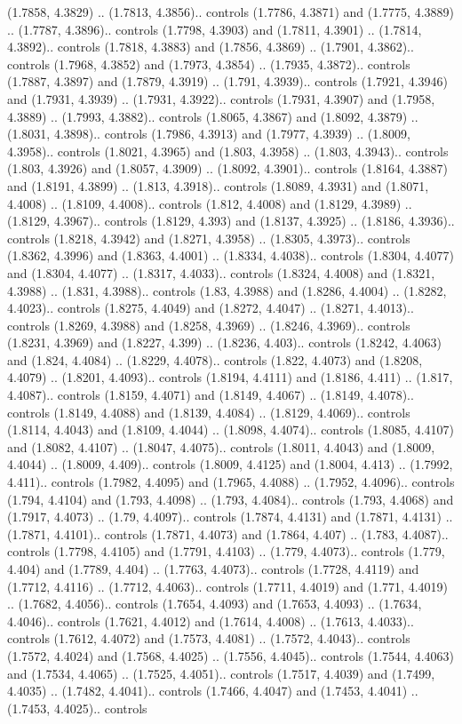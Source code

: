 (1.7858, 4.3829) .. (1.7813, 4.3856).. controls (1.7786, 4.3871) and (1.7775, 4.3889) .. (1.7787, 4.3896).. controls (1.7798, 4.3903) and (1.7811, 4.3901) .. (1.7814, 4.3892).. controls (1.7818, 4.3883) and (1.7856, 4.3869) .. (1.7901, 4.3862).. controls (1.7968, 4.3852) and (1.7973, 4.3854) .. (1.7935, 4.3872).. controls (1.7887, 4.3897) and (1.7879, 4.3919) .. (1.791, 4.3939).. controls (1.7921, 4.3946) and (1.7931, 4.3939) .. (1.7931, 4.3922).. controls (1.7931, 4.3907) and (1.7958, 4.3889) .. (1.7993, 4.3882).. controls (1.8065, 4.3867) and (1.8092, 4.3879) .. (1.8031, 4.3898).. controls (1.7986, 4.3913) and (1.7977, 4.3939) .. (1.8009, 4.3958).. controls (1.8021, 4.3965) and (1.803, 4.3958) .. (1.803, 4.3943).. controls (1.803, 4.3926) and (1.8057, 4.3909) .. (1.8092, 4.3901).. controls (1.8164, 4.3887) and (1.8191, 4.3899) .. (1.813, 4.3918).. controls (1.8089, 4.3931) and (1.8071, 4.4008) .. (1.8109, 4.4008).. controls (1.812, 4.4008) and (1.8129, 4.3989) .. (1.8129, 4.3967).. controls (1.8129, 4.393) and (1.8137, 4.3925) .. (1.8186, 4.3936).. controls (1.8218, 4.3942) and (1.8271, 4.3958) .. (1.8305, 4.3973).. controls (1.8362, 4.3996) and (1.8363, 4.4001) .. (1.8334, 4.4038).. controls (1.8304, 4.4077) and (1.8304, 4.4077) .. (1.8317, 4.4033).. controls (1.8324, 4.4008) and (1.8321, 4.3988) .. (1.831, 4.3988).. controls (1.83, 4.3988) and (1.8286, 4.4004) .. (1.8282, 4.4023).. controls (1.8275, 4.4049) and (1.8272, 4.4047) .. (1.8271, 4.4013).. controls (1.8269, 4.3988) and (1.8258, 4.3969) .. (1.8246, 4.3969).. controls (1.8231, 4.3969) and (1.8227, 4.399) .. (1.8236, 4.403).. controls (1.8242, 4.4063) and (1.824, 4.4084) .. (1.8229, 4.4078).. controls (1.822, 4.4073) and (1.8208, 4.4079) .. (1.8201, 4.4093).. controls (1.8194, 4.4111) and (1.8186, 4.411) .. (1.817, 4.4087).. controls (1.8159, 4.4071) and (1.8149, 4.4067) .. (1.8149, 4.4078).. controls (1.8149, 4.4088) and (1.8139, 4.4084) .. (1.8129, 4.4069).. controls (1.8114, 4.4043) and (1.8109, 4.4044) .. (1.8098, 4.4074).. controls (1.8085, 4.4107) and (1.8082, 4.4107) .. (1.8047, 4.4075).. controls (1.8011, 4.4043) and (1.8009, 4.4044) .. (1.8009, 4.409).. controls (1.8009, 4.4125) and (1.8004, 4.413) .. (1.7992, 4.411).. controls (1.7982, 4.4095) and (1.7965, 4.4088) .. (1.7952, 4.4096).. controls (1.794, 4.4104) and (1.793, 4.4098) .. (1.793, 4.4084).. controls (1.793, 4.4068) and (1.7917, 4.4073) .. (1.79, 4.4097).. controls (1.7874, 4.4131) and (1.7871, 4.4131) .. (1.7871, 4.4101).. controls (1.7871, 4.4073) and (1.7864, 4.407) .. (1.783, 4.4087).. controls (1.7798, 4.4105) and (1.7791, 4.4103) .. (1.779, 4.4073).. controls (1.779, 4.404) and (1.7789, 4.404) .. (1.7763, 4.4073).. controls (1.7728, 4.4119) and (1.7712, 4.4116) .. (1.7712, 4.4063).. controls (1.7711, 4.4019) and (1.771, 4.4019) .. (1.7682, 4.4056).. controls (1.7654, 4.4093) and (1.7653, 4.4093) .. (1.7634, 4.4046).. controls (1.7621, 4.4012) and (1.7614, 4.4008) .. (1.7613, 4.4033).. controls (1.7612, 4.4072) and (1.7573, 4.4081) .. (1.7572, 4.4043).. controls (1.7572, 4.4024) and (1.7568, 4.4025) .. (1.7556, 4.4045).. controls (1.7544, 4.4063) and (1.7534, 4.4065) .. (1.7525, 4.4051).. controls (1.7517, 4.4039) and (1.7499, 4.4035) .. (1.7482, 4.4041).. controls (1.7466, 4.4047) and (1.7453, 4.4041) .. (1.7453, 4.4025).. controls 